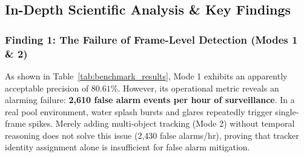 \documentclass[a4paper,11pt]{article}
\begin{document}
\begin{table}[htbp]
\centering
\caption{Empirical Benchmark Performance Comparison Across 6 Surveillance Modes}
\label{tab:benchmark_results}
\end{table}

\subsection{In-Depth Scientific Analysis \& Key Findings}

\subsubsection{Finding 1: The Failure of Frame-Level Detection (Modes 1 \& 2)}
As shown in Table~\ref{tab:benchmark_results}, Mode 1 exhibits an apparently acceptable precision of $80.61\%$. However, its operational metric reveals an alarming failure: \textbf{2,610 false alarm events per hour of surveillance}. In a real pool environment, water splash bursts and glares repeatedly trigger single-frame spikes. Merely adding multi-object tracking (Mode 2) without temporal reasoning does not solve this issue (2,430 false alarms/hr), proving that tracker identity assignment alone is insufficient for false alarm mitigation.
\end{document}
